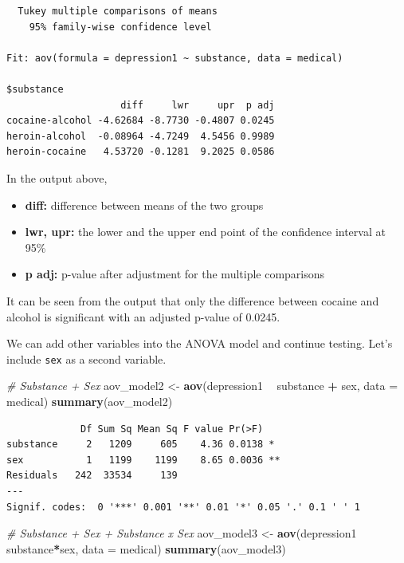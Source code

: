 \documentclass[]{book}
\newenvironment{Shaded}{\begin{snugshade}}{\end{snugshade}}
\newcommand{\CommentTok}[1]{\textcolor[rgb]{0.56,0.35,0.01}{\textit{#1}}}
\newcommand{\DataTypeTok}[1]{\textcolor[rgb]{0.13,0.29,0.53}{#1}}
\newcommand{\KeywordTok}[1]{\textcolor[rgb]{0.13,0.29,0.53}{\textbf{#1}}}
\newcommand{\NormalTok}[1]{#1}
\newcommand{\OperatorTok}[1]{\textcolor[rgb]{0.81,0.36,0.00}{\textbf{#1}}}
\newcommand{\StringTok}[1]{\textcolor[rgb]{0.31,0.60,0.02}{#1}}
\providecommand{\tightlist}{%
  \setlength{\itemsep}{0pt}\setlength{\parskip}{0pt}}
\begin{document}
\begin{verbatim}
  Tukey multiple comparisons of means
    95% family-wise confidence level

Fit: aov(formula = depression1 ~ substance, data = medical)

$substance
                    diff     lwr     upr  p adj
cocaine-alcohol -4.62684 -8.7730 -0.4807 0.0245
heroin-alcohol  -0.08964 -4.7249  4.5456 0.9989
heroin-cocaine   4.53720 -0.1281  9.2025 0.0586
\end{verbatim}

In the output above,

\begin{itemize}
\tightlist
\item
  \textbf{diff:} difference between means of the two groups
\item
  \textbf{lwr, upr:} the lower and the upper end point of the confidence interval at 95\%
\item
  \textbf{p adj:} p-value after adjustment for the multiple comparisons
\end{itemize}

It can be seen from the output that only the difference between cocaine and alcohol is significant with an adjusted p-value of 0.0245.

We can add other variables into the ANOVA model and continue testing. Let's include \texttt{sex} as a second variable.

\begin{Shaded}
\begin{Highlighting}[]
\CommentTok{# Substance + Sex}
\NormalTok{aov_model2 <-}\StringTok{ }\KeywordTok{aov}\NormalTok{(depression1 }\OperatorTok{~}\StringTok{ }\NormalTok{substance }\OperatorTok{+}\StringTok{ }\NormalTok{sex, }\DataTypeTok{data =}\NormalTok{ medical)}
\KeywordTok{summary}\NormalTok{(aov_model2)}
\end{Highlighting}
\end{Shaded}

\begin{verbatim}
             Df Sum Sq Mean Sq F value Pr(>F)   
substance     2   1209     605    4.36 0.0138 * 
sex           1   1199    1199    8.65 0.0036 **
Residuals   242  33534     139                  
---
Signif. codes:  0 '***' 0.001 '**' 0.01 '*' 0.05 '.' 0.1 ' ' 1
\end{verbatim}

\begin{Shaded}
\begin{Highlighting}[]
\CommentTok{# Substance + Sex + Substance x Sex}
\NormalTok{aov_model3 <-}\StringTok{ }\KeywordTok{aov}\NormalTok{(depression1 }\OperatorTok{~}\StringTok{ }\NormalTok{substance}\OperatorTok{*}\NormalTok{sex, }\DataTypeTok{data =}\NormalTok{ medical)}
\KeywordTok{summary}\NormalTok{(aov_model3)}
\end{Highlighting}
\end{Shaded}
\end{document}
